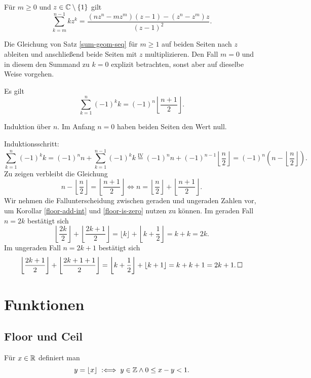 \begin{Korollar}
Für $m\ge 0$ und $z\in\mathbb C\setminus\{1\}$ gilt
\[\sum_{k=m}^{n-1} kz^k
= \frac{(nz^n-mz^m)(z-1) - (z^n-z^m)z}{(z-1)^2}.\]
\end{Korollar}
\begin{Beweis}
Die Gleichung von Satz \ref{sum-geom-seq} für $m\ge 1$ auf beiden
Seiten nach $z$ ableiten und anschließend beide Seiten mit $z$
multiplizieren. Den Fall $m=0$ und in diesem den Summand zu $k=0$
explizit betrachten, sonst aber auf dieselbe Weise vorgehen.\,\qedsymbol
\end{Beweis}

\newpage
\begin{Satz} Es gilt
\[\sum_{k=1}^n (-1)^k k = (-1)^n\left\lfloor\frac{n+1}{2}\right\rfloor.\]
\end{Satz}
\begin{Beweis}
Induktion über $n$. Im Anfang $n=0$ haben beiden Seiten den Wert null.

Induktionsschritt:
\[\sum_{k=1}^n (-1)^k k = (-1)^n n + \sum_{k=1}^{n-1} (-1)^k k
\stackrel{\mathrm{IV}}= (-1)^n n + (-1)^{n-1}\left\lfloor\frac{n}{2}\right\rfloor
= (-1)^n (n-\left\lfloor\frac{n}{2}\right\rfloor).\]
Zu zeigen verbleibt die Gleichung
\[n-\left\lfloor\frac{n}{2}\right\rfloor = \left\lfloor\frac{n+1}{2}\right\rfloor
\iff n = \left\lfloor\frac{n}{2}\right\rfloor + 
\left\lfloor\frac{n+1}{2}\right\rfloor.\]
Wir nehmen die Fallunterscheidung zwischen geraden und ungeraden
Zahlen vor, um Korollar \ref{floor-add-int} und \ref{floor-is-zero}
nutzen zu können. Im geraden Fall $n=2k$ bestätigt sich
\[\left\lfloor\frac{2k}{2}\right\rfloor +  \left\lfloor\frac{2k+1}{2}\right\rfloor
= \lfloor k\rfloor + \left\lfloor k + \frac{1}{2}\right\rfloor = k + k = 2k.\]
Im ungeraden Fall $n=2k+1$ bestätigt sich
\[\left\lfloor\frac{2k+1}{2}\right\rfloor + \left\lfloor\frac{2k+1+1}{2}\right\rfloor
= \left\lfloor k + \frac{1}{2}\right\rfloor + \left\lfloor k+1\right\rfloor
= k + k + 1 = 2k + 1.\,\square\]
\end{Beweis}

\section{Funktionen}

\subsection{Floor und Ceil}

\begin{Definition}[Floorfunktion]\label{def:floor}
Für $x\in\mathbb R$ definiert man
\[y = \lfloor x\rfloor\;:\Longleftrightarrow\; y\in\mathbb Z\land 0\le x-y < 1.\]
\end{Definition}

